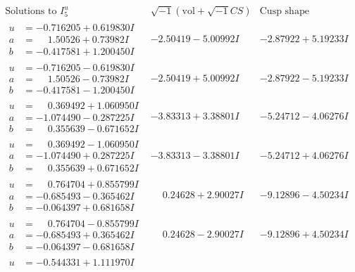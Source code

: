 \documentclass[1p]{elsarticle_modified}
\theoremstyle{definition}
\newcommand{\I}{\sqrt{-1}}
\begin{document}
$$\begin{array}{c|c|c}  
\text{Solutions to }I^u_{5}& \I (\text{vol} + \sqrt{-1}CS) & \text{Cusp shape}\\
 \hline 
\begin{aligned}
u &= -0.716205 + 0.619830 I \\
a &= \phantom{-}1.50526 + 0.73982 I \\
b &= -0.417581 + 1.200450 I\end{aligned}
 & -2.50419 - 5.00992 I & -2.87922 + 5.19233 I \\ \hline\begin{aligned}
u &= -0.716205 - 0.619830 I \\
a &= \phantom{-}1.50526 - 0.73982 I \\
b &= -0.417581 - 1.200450 I\end{aligned}
 & -2.50419 + 5.00992 I & -2.87922 - 5.19233 I \\ \hline\begin{aligned}
u &= \phantom{-}0.369492 + 1.060950 I \\
a &= -1.074490 - 0.287225 I \\
b &= \phantom{-}0.355639 - 0.671652 I\end{aligned}
 & -3.83313 + 3.38801 I & -5.24712 - 4.06276 I \\ \hline\begin{aligned}
u &= \phantom{-}0.369492 - 1.060950 I \\
a &= -1.074490 + 0.287225 I \\
b &= \phantom{-}0.355639 + 0.671652 I\end{aligned}
 & -3.83313 - 3.38801 I & -5.24712 + 4.06276 I \\ \hline\begin{aligned}
u &= \phantom{-}0.764704 + 0.855799 I \\
a &= -0.685493 - 0.365462 I \\
b &= -0.064397 + 0.681658 I\end{aligned}
 & \phantom{-}0.24628 + 2.90027 I & -9.12896 - 4.50234 I \\ \hline\begin{aligned}
u &= \phantom{-}0.764704 - 0.855799 I \\
a &= -0.685493 + 0.365462 I \\
b &= -0.064397 - 0.681658 I\end{aligned}
 & \phantom{-}0.24628 - 2.90027 I & -9.12896 + 4.50234 I \\ \hline\begin{aligned}
u &= -0.544331 + 1.111970 I \\

\end{aligned}
\end{array}$$
\end{document}
